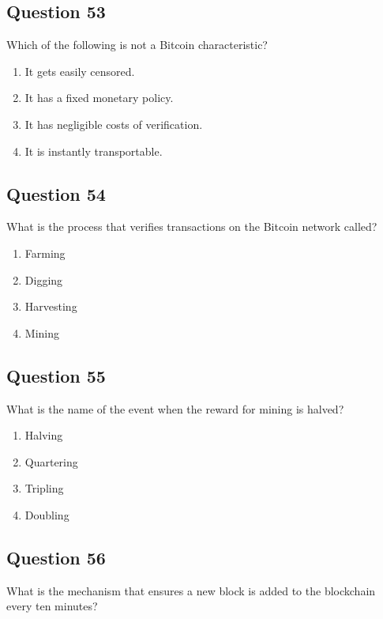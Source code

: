 \documentclass[12pt,a4paper]{article}
\begin{document}
\bigskip


\subsection*{Question 53}
Which of the following is not a Bitcoin characteristic?

\begin{enumerate}[label=\Alph*., leftmargin=*]
\item It gets easily censored.
\item It has a fixed monetary policy.
\item It has negligible costs of verification.
\item It is instantly transportable.
\end{enumerate}

\bigskip


\subsection*{Question 54}
What is the process that verifies transactions on the Bitcoin network called?

\begin{enumerate}[label=\Alph*., leftmargin=*]
\item Farming
\item Digging
\item Harvesting
\item Mining
\end{enumerate}

\bigskip


\subsection*{Question 55}
What is the name of the event when the reward for mining is halved?

\begin{enumerate}[label=\Alph*., leftmargin=*]
\item Halving
\item Quartering
\item Tripling
\item Doubling
\end{enumerate}

\bigskip


\subsection*{Question 56}
What is the mechanism that ensures a new block is added to the blockchain every ten minutes?
\end{document}
